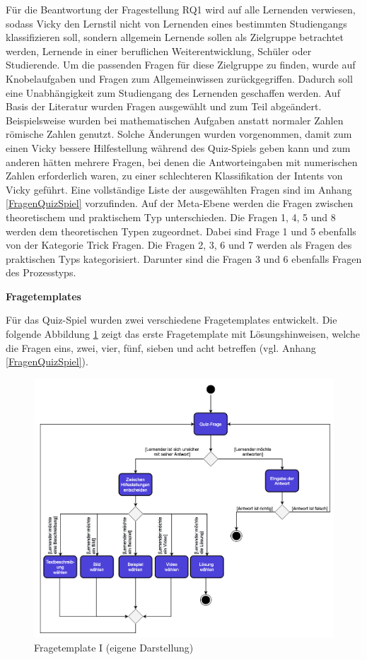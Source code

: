 Für die Beantwortung der Fragestellung RQ1 wird auf alle Lernenden verwiesen, sodass Vicky den Lernstil nicht 
von Lernenden eines bestimmten Studiengangs klassifizieren soll, sondern allgemein Lernende sollen als Zielgruppe 
betrachtet werden, Lernende in einer beruflichen Weiterentwicklung, Schüler oder Studierende.  
Um die passenden Fragen für diese Zielgruppe zu finden, wurde auf Knobelaufgaben und Fragen zum Allgemeinwissen 
zurückgegriffen. Dadurch soll eine Unabhängigkeit zum Studiengang des Lernenden geschaffen werden. 
Auf Basis der Literatur wurden Fragen ausgewählt und zum Teil abgeändert. Beispielsweise wurden bei mathematischen Aufgaben 
anstatt normaler Zahlen 
römische Zahlen genutzt. Solche Änderungen wurden vorgenommen, damit zum einen Vicky bessere Hilfestellung 
während des Quiz-Spiels geben kann und
zum anderen hätten mehrere Fragen, bei denen die Antworteingaben mit numerischen Zahlen erforderlich waren,
zu einer schlechteren Klassifikation der Intents von Vicky geführt. Eine vollständige Liste 
der ausgewählten Fragen sind im Anhang \ref{FragenQuizSpiel} vorzufinden.
Auf der Meta-Ebene werden die Fragen zwischen theoretischem und praktischem Typ unterschieden.
Die Fragen 1, 4, 5 und 8 werden dem theoretischen Typen zugeordnet. Dabei sind Frage 1 und 5 ebenfalls von der Kategorie Trick Fragen.
Die Fragen 2, 3, 6 und 7 werden als Fragen des praktischen Typs kategorisiert. Darunter sind die Fragen 3 und 6 ebenfalls Fragen des Prozesstyps.

\textbf{Fragetemplates} 

Für das Quiz-Spiel wurden zwei verschiedene Fragetemplates entwickelt. 
Die folgende Abbildung \ref{fig:Fragetemplate_I} zeigt das erste Fragetemplate mit Lösungshinweisen, welche die Fragen eins, zwei, vier, fünf,
sieben und acht betreffen (vgl. Anhang \ref{FragenQuizSpiel}). 
\begin{figure}[H]
  \centering
  \includegraphics[width=0.85\linewidth]{images/temI.png}
  \caption[Fragetemplate I]{Fragetemplate I  (eigene Darstellung)}
  \label{fig:Fragetemplate_I}
\end{figure} 


